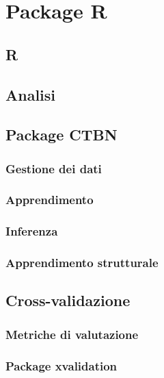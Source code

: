 
\chapter{Package R}
\label{cap:ctbnr}
\omissis{}

\section{R}
\omissis{}

\section{Analisi}
\omissis{}

\section{Package CTBN}
\omissis{}

\subsection{Gestione dei dati}
\omissis{}

\subsection{Apprendimento}
\omissis{}

\subsection{Inferenza}
\omissis{}

\subsection{Apprendimento strutturale}
\omissis{}

\section{Cross-validazione}
\omissis{}

\subsection{Metriche di valutazione}
\omissis{}

\subsection{Package xvalidation}
\omissis{}

